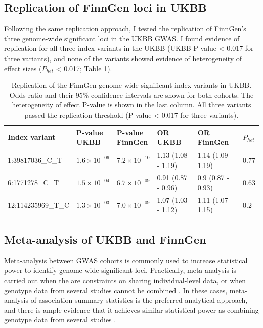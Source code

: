   \subsection{Replication of FinnGen loci in UKBB}
  Following the same replication approach, I tested the replication of FinnGen's three genome-wide significant loci in the UKBB GWAS. I found evidence of replication for all three index variants in the UKBB (UKBB P-value < 0.017 for three variants), and none of the variants showed evidence of heterogeneity of effect sizes ($P_{het}$ < 0.017; Table \ref{table:replication_finngen_in_ukbb}).

  \begin{table}[H]
    \centering\begingroup\fontsize{10}{12}\selectfont
    \caption[Replication of the FinnGen genome-wide significant index variants in the UKBB]{Replication of the FinnGen genome-wide significant index variants in UKBB. Odds ratio and their 95\% confidence  intervals are shown for both cohorts. The heterogeneity of effect P-value is shown in the last column. All three variants passed the replication threshold (P-value < 0.017 for three variants).}
    \label{table:replication_finngen_in_ukbb}
    \begin{tabular}[t]{llllll}
    \toprule
    Index variant & \makecell{P-value\\ UKBB} & \makecell{P-value\\ FinnGen} & \makecell{OR\\ UKBB} & \makecell{OR\\ FinnGen} & $P_{het}$\\
    \midrule
    1:39817036\_C\_T & $1.6\times10^{-06}$ & $7.2\times10^{-10}$ & 1.13 (1.08 - 1.19) & 1.14 (1.09 - 1.19) & $0.77$\\
    6:1771278\_C\_T & $1.5\times10^{-04}$ & $6.7\times10^{-09}$ & 0.91 (0.87 - 0.96) & 0.9 (0.87 - 0.93) & $0.63$\\
    12:114235969\_T\_C & $1.3\times10^{-03}$ & $7.0\times10^{-09}$ & 1.07 (1.03 - 1.12) & 1.11 (1.07 - 1.15) & $0.2$\\
    \bottomrule
    \end{tabular}
    \endgroup{}
    \end{table}


    \subsection{Meta-analysis of UKBB and FinnGen}
    Meta-analysis between GWAS cohorts is commonly used to increase statistical power to identify genome-wide significant loci. Practically, meta-analysis is carried out when the are constraints on sharing individual-level data, or when genotype data from several studies cannot be combined \cite{Evangelou2013-rn}. In these cases, meta-analysis of association summary statistics is the preferred analytical approach, and there is ample evidence that it achieves similar statistical power as combining genotype data from several studies \cite{metal_docs}. \\



